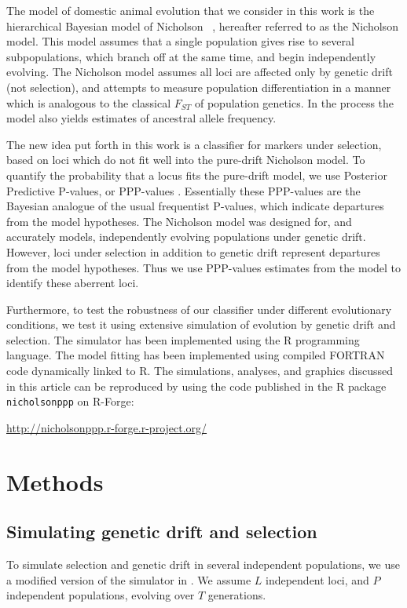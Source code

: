 \documentclass[a4paper,12pt]{article}
\begin{document}
The model of domestic animal evolution that we consider in this work
is the hierarchical Bayesian model of Nicholson \etal\
\cite{nicholson}, hereafter referred to as the Nicholson model. This
model assumes that a single population gives rise to several
subpopulations, which branch off at the same time, and begin
independently evolving. The Nicholson model assumes all loci are
affected only by genetic drift (not selection), and attempts to
measure population differentiation in a manner which is analogous to
the classical $F_{ST}$ of population genetics. In the process the
model also yields estimates of ancestral allele frequency.

The new idea put forth in this work is a classifier for markers under
selection, based on loci which do not fit well into the pure-drift
Nicholson model. To quantify the probability that a locus fits the
pure-drift model, we use Posterior Predictive P-values, or PPP-values
\cite{pppvalues}. Essentially these PPP-values are the Bayesian
analogue of the usual frequentist P-values, which indicate departures
from the model hypotheses. The Nicholson model was designed for, and
accurately models, independently evolving populations under genetic
drift. However, loci under selection in addition to genetic drift
represent departures from the model hypotheses. Thus we use PPP-values
estimates from the model to identify these aberrent loci.

Furthermore, to test the robustness of our classifier under different
evolutionary conditions, we test it using extensive simulation of
evolution by genetic drift and selection. The simulator has been
implemented using the R programming language\cite{R}. The model
fitting has been implemented using compiled FORTRAN code dynamically
linked to R. The simulations, analyses, and graphics discussed in this
article can be reproduced by using the code published in the R package
\texttt{nicholsonppp} on R-Forge\cite{R-Forge}:

 \url{http://nicholsonppp.r-forge.r-project.org/}

\section{Methods}

\subsection{Simulating genetic drift and selection}

To simulate selection and genetic drift in several independent
populations, we use a modified version of the simulator in
\cite{Beaumont-Balding}. We assume $L$ independent loci, and $P$
independent populations, evolving over $T$ generations.
\end{document}
